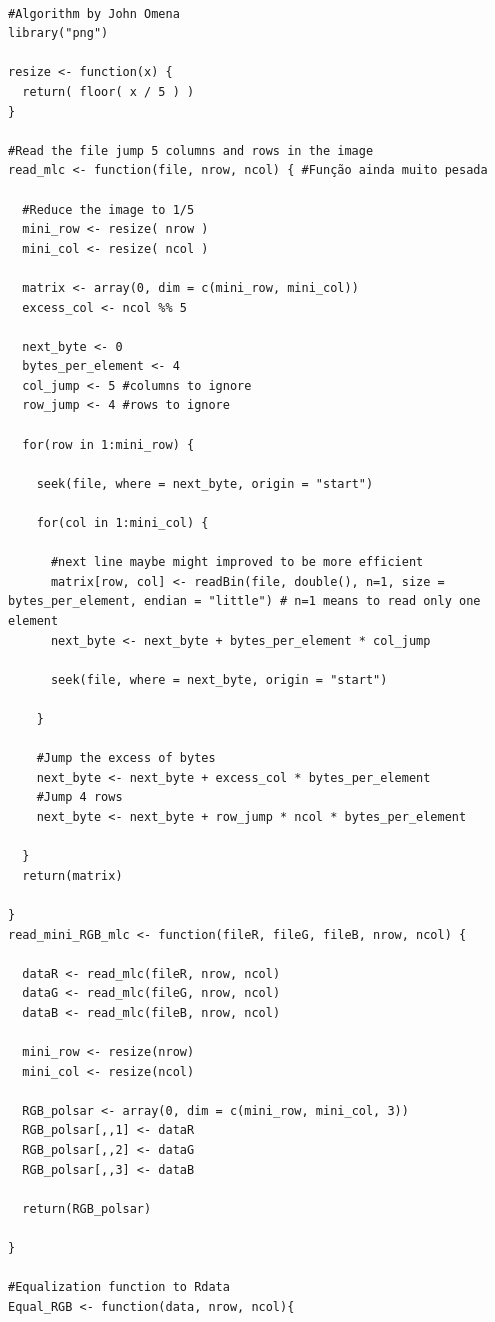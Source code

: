 \documentclass[12pt]{article}
\begin{document}

\begin{verbatim}

#Algorithm by John Omena
library("png")

resize <- function(x) {
  return( floor( x / 5 ) )  
}

#Read the file jump 5 columns and rows in the image
read_mlc <- function(file, nrow, ncol) { #Função ainda muito pesada
  
  #Reduce the image to 1/5
  mini_row <- resize( nrow )
  mini_col <- resize( ncol )
  
  matrix <- array(0, dim = c(mini_row, mini_col))
  excess_col <- ncol %% 5
 
  next_byte <- 0
  bytes_per_element <- 4
  col_jump <- 5 #columns to ignore
  row_jump <- 4 #rows to ignore
  
  for(row in 1:mini_row) {
    
    seek(file, where = next_byte, origin = "start")
    
    for(col in 1:mini_col) {
      
      #next line maybe might improved to be more efficient
      matrix[row, col] <- readBin(file, double(), n=1, size = bytes_per_element, endian = "little") # n=1 means to read only one element
      next_byte <- next_byte + bytes_per_element * col_jump 
      
      seek(file, where = next_byte, origin = "start")
      
    }
    
    #Jump the excess of bytes
    next_byte <- next_byte + excess_col * bytes_per_element 
    #Jump 4 rows
    next_byte <- next_byte + row_jump * ncol * bytes_per_element
    
  }
  return(matrix)
   
}
read_mini_RGB_mlc <- function(fileR, fileG, fileB, nrow, ncol) {
  
  dataR <- read_mlc(fileR, nrow, ncol)
  dataG <- read_mlc(fileG, nrow, ncol)
  dataB <- read_mlc(fileB, nrow, ncol)
  
  mini_row <- resize(nrow)
  mini_col <- resize(ncol)
  
  RGB_polsar <- array(0, dim = c(mini_row, mini_col, 3))
  RGB_polsar[,,1] <- dataR
  RGB_polsar[,,2] <- dataG
  RGB_polsar[,,3] <- dataB
  
  return(RGB_polsar)
  
}

#Equalization function to Rdata
Equal_RGB <- function(data, nrow, ncol){
  

\end{verbatim}
\end{document}
